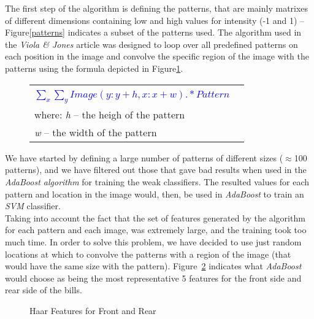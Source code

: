\documentclass[11pt,twocolumn]{article}
\begin{document}
			The first step of the algorithm is defining the patterns, that
			are mainly matrixes of different dimensions containing low and high values
			for intensity (-1 and 1) -- Figure\ref{patterns} indicates a subset of the
			patterns used. The algorithm used in the \emph{Viola \& Jones} article was
			designed to loop over all predefined patterns on each position in the image
			and convolve the specific region of the image with the patterns using the
			formula depicted in Figure\ref{patterns_formula}.\\
			\begin{figure}
				\selectfont\small
				\caption{}
				\begin{tabular}{|lr|} \hline
					& \\[5pt]
					\textcolor{blue}{$\sum_x\sum_y Image(y:y+h,x:x+w) .* Pattern$} &\\[10pt]
					where: \emph{h} -- the heigh of the pattern &\\
					\hspace*{28px} \emph{w} -- the width of the pattern &\\[5pt] 
					\hline 
				\end{tabular}
				\label{patterns_formula}
			\end{figure}
			\hspace*{10px}We have started by defining a large number of patterns of
			different sizes ($\approx$100 patterns), and we have filtered out those that
			gave bad results when used in the \emph{AdaBoost algorithm} for training the
			weak classifiers. The resulted values for each pattern and location in the
			image would, then, be used in \emph{AdaBoost} to train an \emph{SVM}
			classifier.\\ 
			\hspace*{10px}Taking into account the fact that the set of features generated
			by the algorithm for each pattern and each image, was extremely large, and
			the training took too much time. In order to solve this problem, we have
			decided to use just random locations at which to convolve the patterns with a
			region of the image (that would have the same size with the pattern).
			Figure~\ref{Haar_features} indicates what \emph{AdaBoost} would choose as
			being the most representative 5 features for the front side and rear side of
			the bills.\\ 
			\begin{figure}[!hbtp]
				\centering
				\caption{Haar Features for Front and Rear}
				\label{Haar_features}
			\end{figure}
\end{document}
